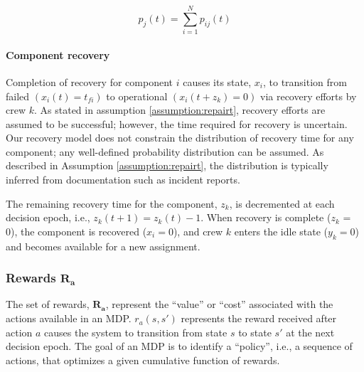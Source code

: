 \documentclass[conference]{IEEEtran}
\begin{document}
\begin{equation}
p_j(t)= \sum_{i=1}^{N} p_{ij}(t)
    \label{eq:c}
\end{equation}

\paragraph{Component recovery} Completion of recovery for component $i$ causes its state, $x_i$, to transition from failed $(x_i(t) =t_{fi})$ to operational $(x_i(t+z_k) = 0)$ via recovery efforts by crew $k$. As stated in assumption \ref{assumption:repairt}, recovery efforts are assumed to be successful; however, the time required for recovery is uncertain. Our recovery model does not constrain the distribution of recovery time for any component; any well-defined probability distribution can be assumed. As described in Assumption \ref{assumption:repairt}, the distribution is typically inferred from documentation such as incident reports. 

The remaining recovery time for the component, $z_k$, is decremented at each decision epoch, i.e.,  $z_k(t+1) = z_k(t) - 1$. When recovery is complete ($z_k$ = 0), the component is recovered ($x_i = 0$), and crew $k$ enters the idle state ($y_k = 0$) and becomes available for a new assignment. 

\subsubsection{Rewards \texorpdfstring{$\mathbf{R_a}$}{R}}
\label{sec:rewards}
The set of rewards, $\mathbf{R_a}$, represent the ``value'' or ``cost'' associated with the actions available in an MDP. $r_a(s,s')$ represents the reward received after action $a$ causes the system to transition from state $s$ to state $s'$ at the next decision epoch. The goal of an MDP is to identify a ``policy'',  i.e., a sequence of actions, that optimizes a given cumulative function of rewards. 
\end{document}
